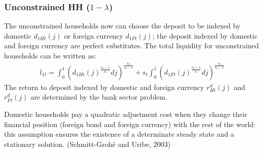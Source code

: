 \documentclass[12pt]{article}
\begin{document}
\subsubsection*{Unconstrained HH ($1-\lambda$)} 
The unconstrained households now can choose the deposit to be indexed by domestic $d_{1Ht}(j)$ or foreign currency $d_{1Ft}(j)$; the deposit indexed by domestic and foreign currency are perfect substitutes. The total liquidity for unconstrained households can be written as: 
\begin{align*}
l_{1t} = \int_0^1({d_{1Ht}(j)}^{\frac{\epsilon_b-1}{\epsilon_b}}dj)^{\frac{\epsilon_b}{\epsilon_b-1}}+s_t\int_0^1({d_{1Ft}(j)}^{\frac{\epsilon_b-1}{\epsilon_b}}dj)^{\frac{\epsilon_b}{\epsilon_b-1}} 
\end{align*}
The return to deposit indexed by domestic and foreign currency $r_{Ht}^d(j)$ and $r_{Ft}^d(j)$ are determined by the bank sector problem. 

Domestic households pay a quadratic adjustment cost when they change their financial position (foreign bond and foreign currency) with the rest of the world: this assumption ensures the existence of a determinate steady state and a stationary solution. (Schmitt-Groh{\'e} and Uribe, 2003)
\end{document}
